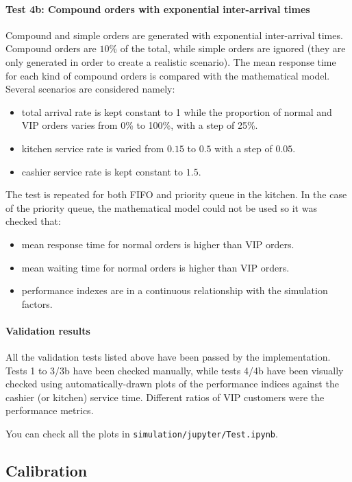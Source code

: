 \paragraph{Test 4b: Compound orders with exponential inter-arrival times}
Compound and simple orders are generated with exponential inter-arrival times.
Compound orders are $10\%$ of the total, while simple orders are ignored (they are
only generated in order to create a realistic scenario). The 
mean response time for each kind of compound orders is compared with the mathematical 
model. Several scenarios are considered namely:
\begin{itemize}
    \item total arrival rate is kept constant to 1 while the proportion of 
        normal and VIP orders varies from 0\% to 100\%, with a step of 25\%.
    \item kitchen service rate is varied from $0.15$ to $0.5$ with a step of $0.05$.
    \item cashier service rate is kept constant to $1.5$.
\end{itemize}
The test is repeated for both FIFO and priority queue in the kitchen. In the case 
of the priority queue, the mathematical model could not be used so it was checked 
that:
\begin{itemize}
    \item mean response time for normal orders is higher than VIP orders.
    \item mean waiting time for normal orders is higher than VIP orders.
    \item performance indexes are in a continuous relationship with the simulation
        factors.
\end{itemize}

\paragraph{Validation results}
All the validation tests listed above have been passed by the implementation.
Tests 1 to 3/3b have been checked manually, while tests 4/4b have been visually 
checked using automatically-drawn plots of the performance indices against the
cashier (or kitchen) service time. Different ratios of VIP customers were 
the performance metrics. 

You can check all the plots in \texttt{simulation/jupyter/Test.ipynb}.



\subsection{Calibration}

